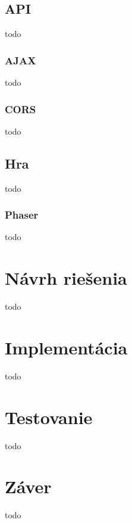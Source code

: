 \section{API}
todo

\subsection{AJAX}
todo

\subsection{CORS}
todo

\section{Hra}
todo

\subsection{Phaser}
todo

\chapter{Návrh riešenia}
todo

\chapter{Implementácia}
todo

\chapter{Testovanie}
todo

\chapter{Záver}
todo












